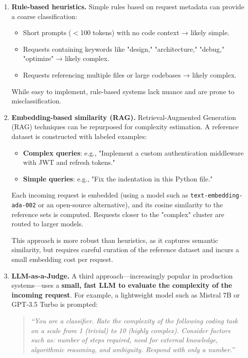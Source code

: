 \documentclass[english]{article}
\begin{document}
\begin{enumerate}
    \item \textbf{Rule-based heuristics.} Simple rules based on request metadata can provide a coarse classification:
    \begin{itemize}
        \item Short prompts ($<$100 tokens) with no code context → likely simple.
        \item Requests containing keywords like "design," "architecture," "debug," "optimize" → likely complex.
        \item Requests referencing multiple files or large codebases → likely complex.
    \end{itemize}
    While easy to implement, rule-based systems lack nuance and are prone to misclassification.

    \item \textbf{Embedding-based similarity (RAG).} Retrieval-Augmented Generation (RAG) techniques can be repurposed for complexity estimation. A reference dataset is constructed with labeled examples:
    \begin{itemize}
        \item \textbf{Complex queries}: e.g., "Implement a custom authentication middleware with JWT and refresh tokens."
        \item \textbf{Simple queries}: e.g., "Fix the indentation in this Python file."
    \end{itemize}
    Each incoming request is embedded (using a model such as \texttt{text-embedding-ada-002} or an open-source alternative), and its cosine similarity to the reference sets is computed. Requests closer to the "complex" cluster are routed to larger models.

    This approach is more robust than heuristics, as it captures semantic similarity, but requires careful curation of the reference dataset and incurs a small embedding cost per request.

    \item \textbf{LLM-as-a-Judge.} A third approach—increasingly popular in production systems—uses a \textbf{small, fast LLM to evaluate the complexity of the incoming request}. For example, a lightweight model such as Mistral 7B or GPT-3.5 Turbo is prompted:

    \begin{quote}
    \textit{``You are a classifier. Rate the complexity of the following coding task on a scale from 1 (trivial) to 10 (highly complex). Consider factors such as: number of steps required, need for external knowledge, algorithmic reasoning, and ambiguity. Respond with only a number.''}
    \end{quote}


\end{enumerate}
\end{document}
